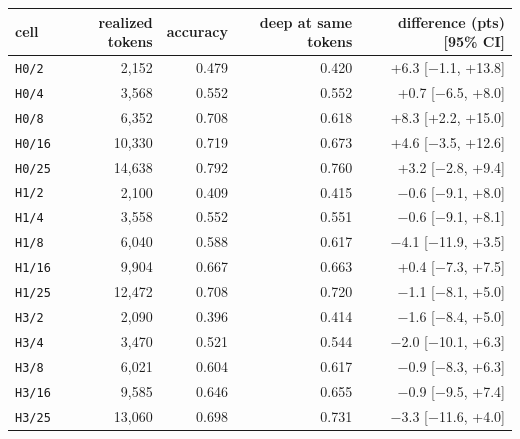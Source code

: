 \begin{tabular}{lrrrr}
\toprule
cell & realized tokens & accuracy & deep at same tokens & difference (pts) [95\% CI] \\ \midrule
\texttt{H0/2} & 2,152 & 0.479 & 0.420 & +6.3 [$-$1.1, +13.8] \\
\texttt{H0/4} & 3,568 & 0.552 & 0.552 & +0.7 [$-$6.5, +8.0] \\
\texttt{H0/8} & 6,352 & 0.708 & 0.618 & +8.3 [+2.2, +15.0] \\
\texttt{H0/16} & 10,330 & 0.719 & 0.673 & +4.6 [$-$3.5, +12.6] \\
\texttt{H0/25} & 14,638 & 0.792 & 0.760 & +3.2 [$-$2.8, +9.4] \\
\texttt{H1/2} & 2,100 & 0.409 & 0.415 & $-$0.6 [$-$9.1, +8.0] \\
\texttt{H1/4} & 3,558 & 0.552 & 0.551 & $-$0.6 [$-$9.1, +8.1] \\
\texttt{H1/8} & 6,040 & 0.588 & 0.617 & $-$4.1 [$-$11.9, +3.5] \\
\texttt{H1/16} & 9,904 & 0.667 & 0.663 & +0.4 [$-$7.3, +7.5] \\
\texttt{H1/25} & 12,472 & 0.708 & 0.720 & $-$1.1 [$-$8.1, +5.0] \\
\texttt{H3/2} & 2,090 & 0.396 & 0.414 & $-$1.6 [$-$8.4, +5.0] \\
\texttt{H3/4} & 3,470 & 0.521 & 0.544 & $-$2.0 [$-$10.1, +6.3] \\
\texttt{H3/8} & 6,021 & 0.604 & 0.617 & $-$0.9 [$-$8.3, +6.3] \\
\texttt{H3/16} & 9,585 & 0.646 & 0.655 & $-$0.9 [$-$9.5, +7.4] \\
\texttt{H3/25} & 13,060 & 0.698 & 0.731 & $-$3.3 [$-$11.6, +4.0] \\
\bottomrule
\end{tabular}

